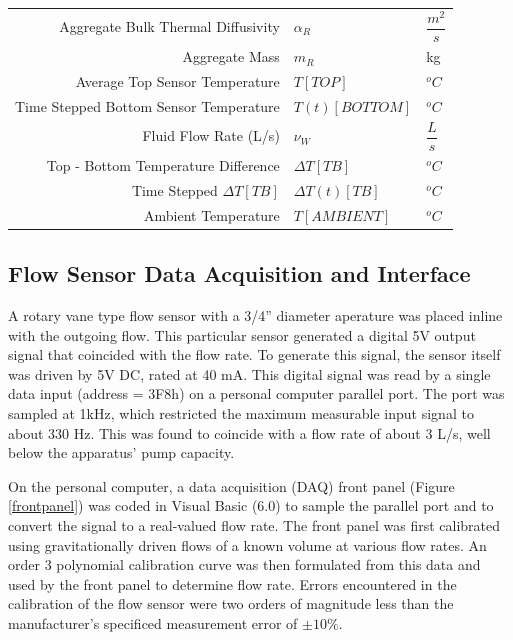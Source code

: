 \documentclass[12pt]{article}
\numberwithin{equation}{section}
\numberwithin{table}{section}
\numberwithin{figure}{section}
\begin{document}
\begin{table}[ht!]
\begin{tabular}{r l l}
Aggregate Bulk Thermal Diffusivity		&	$\alpha_{R}$		& $\dfrac{m^{2}}{s}$\\[3mm]

Aggregate Mass					&	$m_{R}$			& kg\\[3mm]

Average Top Sensor Temperature 			&	$T[TOP]$		& $^{o}C$\\[3mm]

Time Stepped Bottom Sensor Temperature 		&	$T(t)[BOTTOM]$		& $^{o}C$\\[3mm]	

Fluid Flow Rate (L/s)				&	$\nu_{W}$		& $\dfrac{L}{s}$\\[3mm]

Top - Bottom Temperature Difference 		&	$\Delta T[TB]$		& $^{o}C$\\[3mm]

Time Stepped $\Delta T[TB]$ 			&	$\Delta T(t)[TB]$	& $^{o}C$\\[3mm]

Ambient Temperature				&	$T[AMBIENT]$		& $^{o}C$\\[3mm]

\hline
\end{tabular}
\end{table} 

\subsection{Flow Sensor Data Acquisition and Interface}
A rotary vane type flow sensor with a 3/4'' diameter aperature was placed inline with the outgoing flow. This particular sensor generated a digital 5V output signal that coincided with the flow rate. To generate this signal, the sensor itself was driven by 5V DC, rated at 40 mA. This digital signal was read by a single data input (address = 3F8h) on a personal computer parallel port. The port was sampled at 1kHz, which restricted the maximum measurable input signal to about 330 Hz. This was found to coincide with a flow rate of about 3 L/s, well below the apparatus' pump capacity.

On the personal computer, a data acquisition (DAQ) front panel (Figure \ref{frontpanel}) was coded in Visual Basic (6.0) to sample the parallel port and to convert the signal to a real-valued flow rate. The front panel was first calibrated using gravitationally driven flows of a known volume at various flow rates. An order 3 polynomial calibration curve was then formulated from this data and used by the front panel to determine flow rate. Errors encountered in the calibration of the flow sensor were two orders of magnitude less than the manufacturer's specificed measurement error of $\pm10\%$. 
\end{document}
